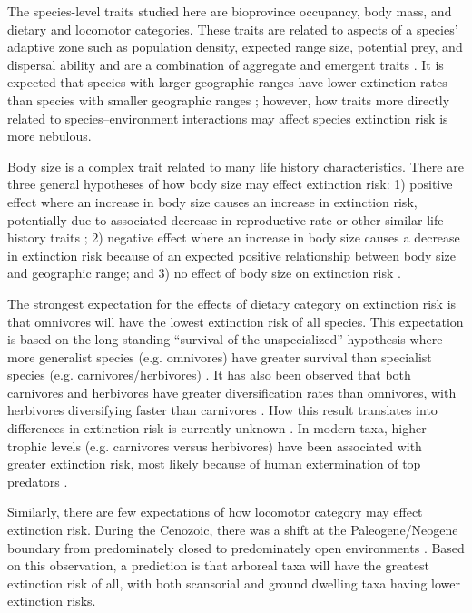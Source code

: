 \documentclass{pnastwo}
\begin{document}
\begin{article}
The species-level traits studied here are bioprovince occupancy, body mass, and dietary and locomotor categories. These traits are related to aspects of a species' adaptive zone such as population density, expected range size, potential prey, and dispersal ability \cite{Smith2004,Jernvall2004} and are a combination of aggregate and emergent traits \cite{Jablonski2008a}. It is expected that species with larger geographic ranges have lower extinction rates than species with smaller geographic ranges \cite{Jablonski1986,Roy2009c}; however, how traits more directly related to species--environment interactions may affect species extinction risk is more nebulous.

Body size is a complex trait related to many life history characteristics. There are three general hypotheses of how body size may effect extinction risk: 1) positive effect where an increase in body size causes an increase in extinction risk, potentially due to associated decrease in reproductive rate or other similar life history traits \cite{Liow2008,Liow2009}; 2) negative effect where an increase in body size causes a decrease in extinction risk because of an expected positive relationship between body size and geographic range; and 3) no effect of body size on extinction risk \cite{Tomiya2013}. 

The strongest expectation for the effects of dietary category on extinction risk is that omnivores will have the lowest extinction risk of all species. This expectation is based on the long standing ``survival of the unspecialized'' hypothesis where more generalist species (e.g. omnivores) have greater survival than specialist species (e.g. carnivores/herbivores) \cite{Simpson1944,Liow2004a}. It has also been observed that both carnivores and herbivores have greater diversification rates than omnivores, with herbivores diversifying faster than carnivores \cite{Price2012}. How this result translates into differences in extinction risk is currently unknown \cite{Rabosky2010a}. In modern taxa, higher trophic levels (e.g. carnivores versus herbivores) have been associated with greater extinction risk, most likely because of human extermination of top predators \cite{Liow2009,Purvis2000a}. 

Similarly, there are few expectations of how locomotor category may effect extinction risk. During the Cenozoic, there was a shift at the Paleogene/Neogene boundary from predominately closed to predominately open environments \cite{Blois2009,Janis1993a}. Based on this observation, a prediction is that arboreal taxa will have the greatest extinction risk of all, with both scansorial and ground dwelling taxa having lower extinction risks. 


\end{article}
\end{document}
